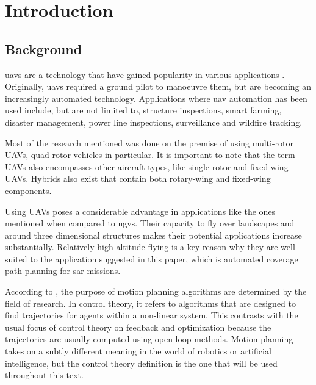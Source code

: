 \chapter{Introduction}
\label{chp:intro}


\section{Background}
\label{sec:intro_bg}
\Acfp{uav} are a technology that have gained popularity in various applications \cite{CPP-Survey-2019}. Originally, \acsp{uav} required a ground pilot to manoeuvre them, but are becoming an increasingly automated technology. Applications where \acs{uav} automation has been used include, but are not limited to, structure inspections\cite{Guerrero2013}, smart farming\cite{Lottes2017}, disaster management\cite{Maza2011}, power line inspections\cite{Chang2017}, surveillance\cite{Basilico2015} and wildfire tracking\cite{Pham2017}.

Most of the research mentioned was done on the premise of using multi-rotor UAVs, quad-rotor vehicles in particular. It is important to note that the term UAVs also encompasses other aircraft types, like single rotor and fixed wing UAVs. Hybrids also exist that contain both rotary-wing and fixed-wing components\cite{CPP-Survey-2019}.

Using UAVs poses a considerable advantage in applications like the ones mentioned when compared to \acfp{ugv}. Their capacity to fly over landscapes and around three dimensional structures makes their potential applications increase substantially. Relatively high altitude flying is a key reason why they are well suited to the application suggested in this paper, which is automated coverage path planning for \acf{sar} missions.

According to \cite{Lavalle2006}, the purpose of motion planning algorithms are determined by the field of research. In control theory, it refers to algorithms that are designed to find trajectories for agents within a non-linear system. This contrasts with the usual focus of control theory on feedback and optimization because the trajectories are usually computed using open-loop methods. Motion planning takes on a subtly different meaning in the world of robotics or artificial intelligence, but the control theory definition is the one that will be used throughout this text. 

